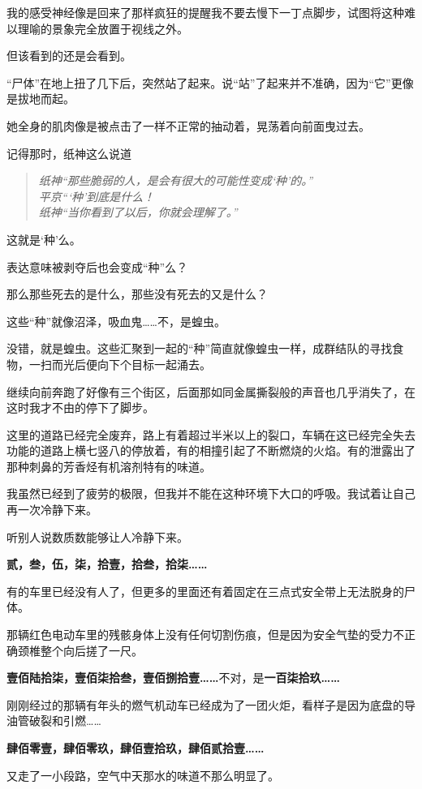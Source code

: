 我的感受神经像是回来了那样疯狂的提醒我不要去慢下一丁点脚步，试图将这种难以理喻的景象完全放置于视线之外。

但该看到的还是会看到。

“尸体”在地上扭了几下后，突然站了起来。说“站”了起来并不准确，因为“它”更像是拔地而起。

她全身的肌肉像是被点击了一样不正常的抽动着，晃荡着向前面曳过去。

记得那时，纸神这么说道
\begin{quote}
	\textit{纸神“那些脆弱的人，是会有很大的可能性变成‘种’的。”\\	平京“‘种’到底是什么！\\纸神“当你看到了以后，你就会理解了。”}
\end{quote}

这就是‘种’么。

表达意味被剥夺后也会变成“种”么？

那么那些死去的是什么，那些没有死去的又是什么？

这些“种”就像沼泽，吸血鬼……不，是蝗虫。

没错，就是蝗虫。这些汇聚到一起的“种”简直就像蝗虫一样，成群结队的寻找食物，一扫而光后便向下个目标一起涌去。

继续向前奔跑了好像有三个街区，后面那如同金属撕裂般的声音也几乎消失了，在这时我才不由的停下了脚步。

这里的道路已经完全废弃，路上有着超过半米以上的裂口，车辆在这已经完全失去功能的道路上横七竖八的停放着，有的相撞引起了不断燃烧的火焰。有的泄露出了那种刺鼻的芳香烃有机溶剂特有的味道。

我虽然已经到了疲劳的极限，但我并不能在这种环境下大口的呼吸。我试着让自己再一次冷静下来。

听别人说数质数能够让人冷静下来。

\textbf{贰，叁，伍，柒，拾壹，拾叁，拾柒……}%

有的车里已经没有人了，但更多的里面还有着固定在三点式安全带上无法脱身的尸体。

那辆红色电动车里的残骸身体上没有任何切割伤痕，但是因为安全气垫的受力不正确颈椎整个向后搓了一尺。

\textbf{壹佰陆拾柒，壹佰柒拾叁，壹佰捌拾壹……}不对，是\textbf{一百柒拾玖……}

刚刚经过的那辆有年头的燃气机动车已经成为了一团火炬，看样子是因为底盘的导油管破裂和引燃……

\textbf{肆佰零壹，肆佰零玖，肆佰壹拾玖，肆佰贰拾壹……}

又走了一小段路，空气中天那水的味道不那么明显了。

